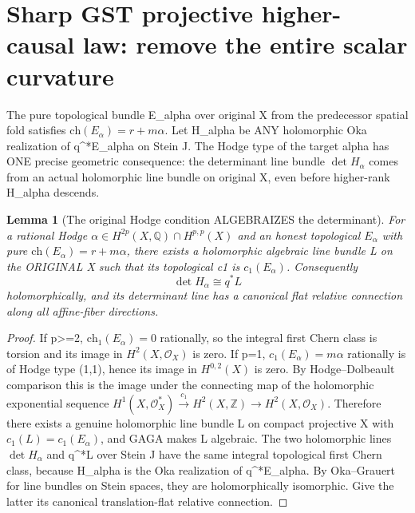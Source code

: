 \documentclass[11pt]{article}
\newtheorem{lemma}[theorem]{Lemma}
\begin{document}
\section{Sharp GST projective higher-causal law: remove the entire scalar curvature}

The pure topological bundle E_alpha over
original X from the predecessor spatial
fold satisfies
$\mathrm{ch}(E_\alpha)=r+m\alpha$.
Let H_alpha be ANY holomorphic Oka
realization of q^*E_alpha on Stein J.
The Hodge type of the target alpha
has ONE precise geometric consequence:
the determinant line bundle
$\det H_\alpha$ comes from an actual
holomorphic line bundle on original X,
even before higher-rank H_alpha descends.

\begin{lemma}[The original Hodge condition ALGEBRAIZES the determinant]
For a rational Hodge
$\alpha\in H^{2p}(X,\mathbb Q)\cap H^{p,p}(X)$
and an honest topological
$E_\alpha$ with pure
$\mathrm{ch}(E_\alpha)=r+m\alpha$,
there exists a holomorphic algebraic
line bundle L on the ORIGINAL X
such that its topological c1 is
$c_1(E_\alpha)$. Consequently
\[
 \boxed{\det H_\alpha\cong q^*L}
 \tag{19}
\]
holomorphically, and its determinant
line has a canonical flat relative
connection along all affine-fiber
directions.
\end{lemma}
\begin{proof}
If p>=2, $\mathrm{ch}_1(E_\alpha)=0$
rationally, so the integral first
Chern class is torsion and its
image in $H^2(X,\mathcal O_X)$
is zero. If p=1,
$c_1(E_\alpha)=m\alpha$ rationally
is of Hodge type (1,1), hence its
image in $H^{0,2}(X)$ is zero.
By Hodge--Dolbeault comparison
this is the image under the
connecting map of the holomorphic
exponential sequence
$H^1(X,\mathcal O_X^*)
 \xrightarrow{c_1}H^2(X,\mathbb Z)
 \to H^2(X,\mathcal O_X)$.
Therefore there exists a genuine
holomorphic line bundle L on
compact projective X with
$c_1(L)=c_1(E_\alpha)$,
and GAGA makes L algebraic.
The two holomorphic lines
$\det H_\alpha$ and q^*L over
Stein J have the same integral
topological first Chern class,
because H_alpha is the
Oka realization of q^*E_alpha.
By Oka--Grauert for line bundles
on Stein spaces, they are
holomorphically isomorphic.
Give the latter its canonical
translation-flat relative connection.
\end{proof}
\end{document}
